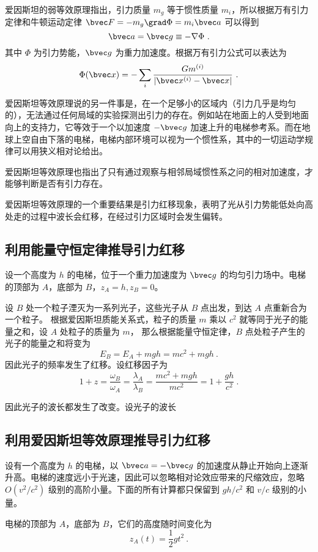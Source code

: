 

爱因斯坦的弱等效原理指出，引力质量 $m_g$ 等于惯性质量 $m_i$，所以根据万有引力定律和牛顿运动定律 $\bvec F=-m_g \grad \Phi = m_i \bvec a$ 可以得到 
\begin{equation}
\bvec a=\bvec g \equiv -\nabla\Phi~.
\end{equation}
其中 $\Phi$ 为引力势能，$\bvec g$ 为重力加速度。根据万有引力公式可以表达为
\begin{equation}
\Phi(\bvec x)=-\sum_{i} \frac{G m^{(i)}}{|\bvec x^{(i)}-\bvec x|}~.
\end{equation}

爱因斯坦等效原理说的另一件事是，在一个足够小的区域内（引力几乎是均匀的），无法通过任何局域的实验探测出引力的存在。例如站在地面上的人受到地面向上的支持力，它等效于一个以加速度 $-\bvec g$ 加速上升的电梯参考系。而在地球上空自由下落的电梯，电梯内部环境可以视为一个惯性系，其中的一切运动学规律可以用狭义相对论给出。

爱因斯坦等效原理也指出了只有通过观察与相邻局域惯性系之问的相对加速度，才能够判断是否有引力存在。

爱因斯坦等效原理的一个重要结果是引力红移现象，表明了光从引力势能低处向高处走的过程中波长会红移，在经过引力区域时会发生偏转。
\subsection{利用能量守恒定律推导引力红移}
设一个高度为 $h$ 的电梯，位于一个重力加速度为 $\bvec g$ 的均匀引力场中。电梯的顶部为 $A$，底部为 $B$，$z_A=h,z_B=0$。

设 $B$ 处一个粒子湮灭为一系列光子，这些光子从 $B$ 点出发，到达 $A$ 点重新合为一个粒子。
根据爱因斯坦质能关系式，粒子的质量 $m$ 乘以 $c^2$ 就等同于光子的能量之和，设 $A$ 处粒子的质量为 $m$，
那么根据能量守恒定律，$B$ 点处粒子产生的光子的能量之和将变为
\begin{equation}
E_B=E_A+mgh = mc^2+mgh~.
\end{equation}
因此光子的频率发生了红移。设红移因子为
\begin{equation}
1+z=\frac{\omega_B}{\omega_A} = \frac{\lambda_A}{\lambda_B} = \frac{mc^2+mgh}{mc^2} = 1+\frac{gh}{c^2}~.
\end{equation}

因此光子的波长都发生了改变。设光子的波长

\subsection{利用爱因斯坦等效原理推导引力红移}
设有一个高度为 $h$ 的电梯，以 $\bvec a=-\bvec g$ 的加速度从静止开始向上逐渐升高。电梯的速度远小于光速，因此可以忽略相对论效应带来的尺缩效应，忽略 $O(v^2/c^2)$ 级别的高阶小量。下面的所有计算都只保留到 $gh/c^2$ 和 $v/c$ 级别的小量。

电梯的顶部为 $A$，底部为 $B$，它们的高度随时间变化为
\begin{equation}
z_A(t)=\frac{1}{2}gt^2~.
\end{equation}

